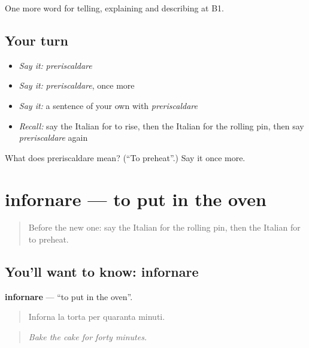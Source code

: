 \begin{grammarlens}[title={What you've built}]
One more word for telling, explaining and describing at B1.
\end{grammarlens}

\subsection*{Your turn}
\begin{itemize}
\raggedright
  \item \emph{Say it:} \emph{preriscaldare}
  \item \emph{Say it:} \emph{preriscaldare}, once more
  \item \emph{Say it:} a sentence of your own with \emph{preriscaldare}
  \item \emph{Recall:} say the Italian for to rise, then the Italian for the rolling pin, then say \emph{preriscaldare} again
\end{itemize}

\begin{tcolorbox}[breakable,colback=teal!4,colframe=teal!35!black,title={Before you move on}]
What does preriscaldare mean? (\textquotedblleft{}To preheat\textquotedblright{}.) Say it once more.
\end{tcolorbox}
\section[infornare]{infornare — to put in the oven}

\label{lesson:IT-C336-infornare}



\begin{quote}
Before the new one: say the Italian for the rolling pin, then the Italian for to preheat.
\end{quote}

\subsection*{You'll want to know: infornare}
\textbf{infornare} — \textquotedblleft{}to put in the oven\textquotedblright{}.

\begin{quote}
Inforna la torta per quaranta minuti.
\end{quote}

\begin{quote}
\emph{Bake the cake for forty minutes.}
\end{quote}

